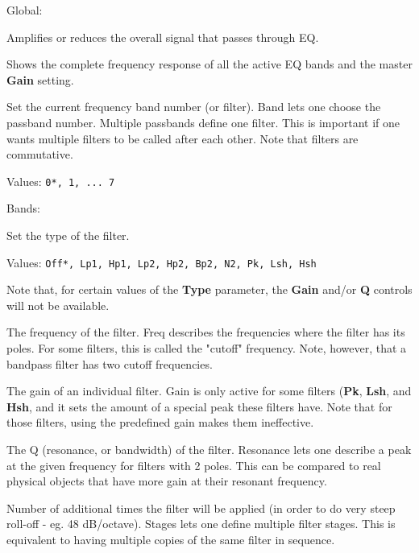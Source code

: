    Global:

   \setcounter{ItemCounter}{0}      %

   Amplifies or reduces the overall signal that passes through EQ.

   Shows the complete frequency response of all the active EQ bands and the
   master \textbf{Gain} setting.

   Set the current frequency band number (or filter).
   Band lets one choose the passband number. Multiple passbands define one
   filter. This is important if one wants multiple filters to be called
   after each other. Note that filters are commutative.

   Values: \texttt{0*, 1, ... 7}

   Bands:

   Set the type of the filter.

   Values: \texttt{Off*, Lp1, Hp1, Lp2, Hp2, Bp2, N2, Pk, Lsh, Hsh}

   Note that, for certain values of the \textbf{Type} parameter, the
   \textbf{Gain} and/or \textbf{Q} controls will not be available.

   The frequency of the filter.
   Freq describes the frequencies where the filter has its poles. For some
   filters, this is called the "cutoff" frequency. Note, however, that a
   bandpass filter has two cutoff frequencies.

   The gain of an individual filter.
   Gain is only active for some filters
   (\textbf{Pk}, \textbf{Lsh}, and \textbf{Hsh},
   and it sets the amount of a special
   peak these filters have. Note that for those filters, using the
   predefined gain makes them ineffective.

   The Q (resonance, or bandwidth) of the filter.
   Resonance lets one describe a peak at the given frequency for filters
   with 2 poles. This can be compared to real physical objects that have
   more gain at their resonant frequency.

   Number of additional times the filter will be applied (in
   order to do very steep roll-off - eg. 48 dB/octave).
   Stages lets one define multiple filter stages. This is equivalent to
   having multiple copies of the same filter in sequence.

